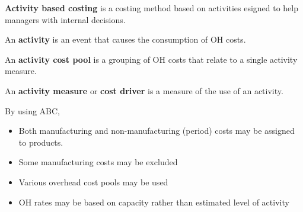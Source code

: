 \documentclass[english, 12pt]{article}
\begin{document}
\begin{defn}
\textbf{Activity based costing} is a costing method based on activities esigned to help managers with internal decisions.
\end{defn}

\begin{defn}
An \textbf{activity} is an event that causes the consumption of OH costs.
\end{defn}

\begin{defn}
An \textbf{activity cost pool} is a grouping of OH costs that relate to a single activity measure.
\end{defn}

\begin{defn}
An \textbf{activity measure} or \textbf{cost driver} is a measure of the use of an activity.
\end{defn}

\begin{qte}
By using ABC,
\begin{itemize}
\item Both manufacturing and non-manufacturing (period) costs may be assigned to products.
\item Some manufacturing costs may be excluded
\item Various overhead cost pools may be used
\item OH rates may be based on capacity rather than estimated level of activity
\end{itemize}
\end{qte}
\end{document}
